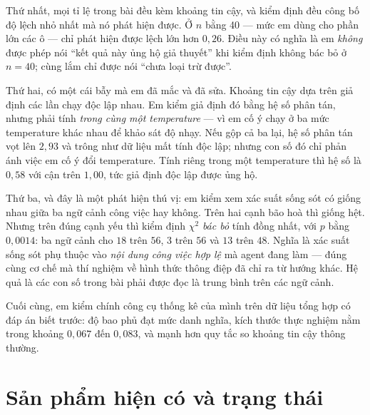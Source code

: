 \documentclass[11pt,a4paper]{article}
\newcommand{\slide}[1]{\section{#1}}
\begin{document}
Thứ nhất, mọi tỉ lệ trong bài đều kèm khoảng tin cậy, và kiểm định đều công bố độ lệch
nhỏ nhất mà nó phát hiện được. Ở $n$ bằng 40 --- mức em dùng cho phần lớn các ô --- chỉ
phát hiện được lệch lớn hơn $0{,}26$. Điều này có nghĩa là em \emph{không} được phép
nói ``kết quả này ủng hộ giả thuyết'' khi kiểm định không bác bỏ ở $n = 40$; cùng lắm
chỉ được nói ``chưa loại trừ được''.

Thứ hai, có một cái bẫy mà em đã mắc và đã sửa. Khoảng tin cậy dựa trên giả định các
lần chạy độc lập nhau. Em kiểm giả định đó bằng hệ số phân tán, nhưng phải tính
\emph{trong cùng một temperature} --- vì em cố ý chạy ở ba mức temperature khác nhau để
khảo sát độ nhạy. Nếu gộp cả ba lại, hệ số phân tán vọt lên $2{,}93$ và trông như dữ
liệu mất tính độc lập; nhưng con số đó chỉ phản ánh việc em cố ý đổi temperature. Tính
riêng trong một temperature thì hệ số là $0{,}58$ với cận trên $1{,}00$, tức giả định
độc lập được ủng hộ.

Thứ ba, và đây là một phát hiện thú vị: em kiểm xem xác suất sống sót có giống nhau
giữa ba ngữ cảnh công việc hay không. Trên hai cạnh bão hoà thì giống hệt. Nhưng trên
đúng cạnh yếu thì kiểm định $\chi^2$ \emph{bác bỏ} tính đồng nhất, với $p$ bằng
$0{,}0014$: ba ngữ cảnh cho $18$ trên $56$, $3$ trên $56$ và $13$ trên $48$. Nghĩa là
xác suất sống sót phụ thuộc vào \emph{nội dung công việc hợp lệ} mà agent đang làm ---
đúng cùng cơ chế mà thí nghiệm về hình thức thông điệp đã chỉ ra từ hướng khác. Hệ quả
là các con số trong bài phải được đọc là trung bình trên các ngữ cảnh.

Cuối cùng, em kiểm chính công cụ thống kê của mình trên dữ liệu tổng hợp có đáp án
biết trước: độ bao phủ đạt mức danh nghĩa, kích thước thực nghiệm nằm trong khoảng
$0{,}067$ đến $0{,}083$, và mạnh hơn quy tắc so khoảng tin cậy thông thường.

\slide{Sản phẩm hiện có và trạng thái}
\end{document}
